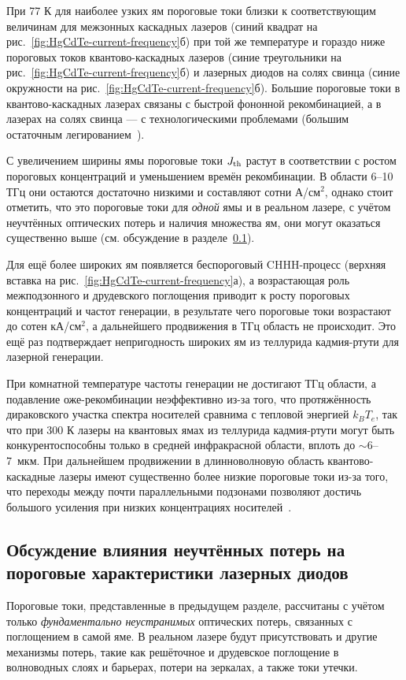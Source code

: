При 77 К для наиболее узких ям пороговые токи близки к соответствующим величинам для межзонных каскадных лазеров (синий квадрат на рис.~\ref{fig:HgCdTe-current-frequency}б) при той же температуре и гораздо ниже пороговых токов квантово-каскадных лазеров (синие треугольники на рис.~\ref{fig:HgCdTe-current-frequency}б) и лазерных диодов на солях свинца (синие окружности на рис.~\ref{fig:HgCdTe-current-frequency}б). Большие пороговые токи в квантово-каскадных лазерах связаны с быстрой фононной рекомбинацией, а в лазерах на солях свинца --- с технологическими проблемами (большим остаточным легированием~\cite{lead_salt_problems}).

С увеличением ширины ямы пороговые токи $J_{\rm th}$ растут в соответствии с ростом пороговых концентраций и уменьшением времён рекомбинации. В области 6--10 ТГц они остаются достаточно низкими и составляют сотни А/см$^2$, однако стоит отметить, что это пороговые токи для \emph{одной} ямы и в реальном лазере, с учётом неучтённых оптических потерь и наличия множества ям, они могут оказаться существенно выше (см. обсуждение в разделе~\ref{sec:HgCdTe-discussion}).

Для ещё более широких ям появляется беспороговый CHHH-процесс (верхняя вставка на рис.~\ref{fig:HgCdTe-current-frequency}а), а возрастающая роль межподзонного и друдевского поглощения приводит к росту пороговых концентраций и частот генерации, в результате чего пороговые токи возрастают до сотен кА/см$^2$, а дальнейшего продвижения в ТГц область не происходит. Это ещё раз подтверждает непригодность широких ям из теллурида кадмия-ртути для лазерной генерации.

При комнатной температуре частоты генерации не достигают ТГц области, а подавление оже-рекомбинации неэффективно из-за того, что протяжённость дираковского участка спектра носителей сравнима с тепловой энергией $k_B T_e$, так что при 300 К лазеры на квантовых ямах из теллурида кадмия-ртути могут быть конкурентоспособны только в средней инфракрасной области, вплоть до $\sim 6$--7~мкм. При дальнейшем продвижении в длинноволновую область квантово-каскадные лазеры имеют существенно более низкие пороговые токи из-за того, что переходы между почти параллельными подзонами позволяют достичь большого усиления при низких концентрациях носителей~\cite{QCL_threshold_concentration}.

\subsection{Обсуждение влияния неучтённых потерь на пороговые характеристики лазерных диодов}
\label{sec:HgCdTe-discussion}
Пороговые токи, представленные в предыдущем разделе, рассчитаны с учётом только \emph{фундаментально неустранимых} оптических потерь, связанных с поглощением в самой яме. В реальном лазере будут присутствовать и другие механизмы потерь, такие как решёточное и друдевское поглощение в волноводных слоях и барьерах, потери на зеркалах, а также токи утечки.

